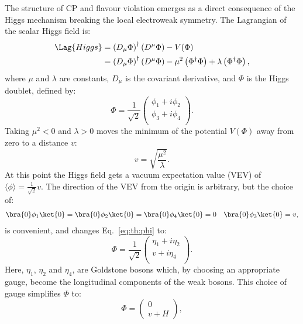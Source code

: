 The structure of CP and flavour violation emerges as a direct consequence of the Higgs mechanism
breaking the local electroweak symmetry.
The Lagrangian of the scalar Higgs field is:
\begin{align}
  \Lag{Higgs}
  &= \left(D_\mu\Phi\right)^\dagger\left(D^\mu\Phi\right) - V(\Phi) \\
  &= \left(D_\mu\Phi\right)^\dagger\left(D^\mu\Phi\right) - \mu^2\left(\Phi^\dagger\Phi\right) +
  \lambda\left(\Phi^\dagger\Phi\right),
  \label{eq:th:laghiggs1}
\end{align}
where $\mu$ and $\lambda$ are constants, $D_\mu$ is the covariant derivative, and $\Phi$ is the
Higgs doublet, defined by:
\begin{equation}
  \Phi = \frac{1}{\sqrt{2}}
  \begin{pmatrix}
    \phi_1 + i\phi_2 \\
    \phi_3 + i\phi_4 \\
  \end{pmatrix}.
  \label{eq:th:phi}
\end{equation}
Taking $\mu^2<0$ and $\lambda>0$ moves the minimum of the potential $V(\Phi)$ away from zero to a distance $v$:
\begin{equation}
  v = \sqrt{\frac{\mu^2}{\lambda}}.
\end{equation}
At this point the Higgs field gets a vacuum expectation value (VEV)
of $\langle\phi\rangle = \tfrac{1}{\sqrt{2}}v$.
The direction of the VEV from the origin is arbitrary, but the choice of:
\begin{align}
  \bra{0}\phi_1\ket{0} =
  \bra{0}\phi_2\ket{0} =
  \bra{0}\phi_4\ket{0} = 0  &&
  \bra{0}\phi_3\ket{0} = v,
\end{align}
is convenient, and changes Eq.~\ref{eq:th:phi} to:
\begin{equation}
  \Phi = \frac{1}{\sqrt{2}}
  \begin{pmatrix}
    \eta_1 + i\eta_2 \\
    v + i\eta_4 \\
  \end{pmatrix}.
  \label{eq:th:eta}
\end{equation}
Here, $\eta_1$, $\eta_2$ and $\eta_4$, are Goldstone bosons which, by choosing an appropriate
gauge, become the longitudinal components of the weak bosons.
This choice of gauge simplifies $\Phi$ to:
\begin{equation}
  \Phi =
  \begin{pmatrix} 0 \\ v+H
  \end{pmatrix},
  \label{eq:th:phi2}
\end{equation}
